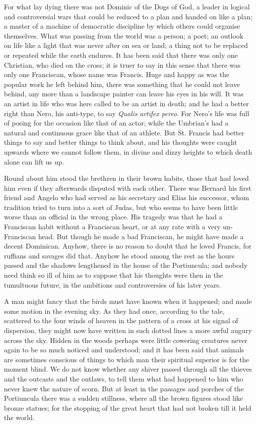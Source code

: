 \documentclass{book}
\begin{document}
For what lay dying there was not Dominic of the Dogs of God, a leader in logical and controversial wars that could be reduced to a plan and handed on like a plan; a master of a machine of democratic discipline by which others could organise themselves. What was passing from the world was a person; a poet; an outlook on life like a light that was never after on sea or land; a thing not to be replaced or repeated while the earth endures. It has been said that there was only one Christian, who died on the cross; it is truer to say in this sense that there was only one Franciscan, whose name was Francis. Huge and happy as was the popular work he left behind him, there was something that he could not leave behind, any more than a landscape painter can leave his eyes in his will. It was an artist in life who was here called to be an artist in death; and he had a better right than Nero, his anti-type, to say \emph{Qualis artifex pereo}. For Nero’s life was full of posing for the occasion like that of an actor; while the Umbrian’s had a natural and continuous grace like that of an athlete. But St. Francis had better things to say and better things to think about, and his thoughts were caught upwards where we cannot follow them, in divine and dizzy heights to which death alone can lift us up.

Round about him stood the brethren in their brown habits, those that had loved him even if they afterwards disputed with each other. There was Bernard his first friend and Angelo who had served as his secretary and Elias his successor, whom tradition tried to turn into a sort of Judas, but who seems to have been little worse than an official in the wrong place. His tragedy was that he had a Franciscan habit without a Franciscan heart, or at any rate with a very un-Franciscan head. But though he made a bad Franciscan, he might have made a decent Dominican. Anyhow, there is no reason to doubt that he loved Francis, for ruffians and savages did that. Anyhow he stood among the rest as the hours passed and the shadows lengthened in the house of the Portiuncula; and nobody need think so ill of him as to suppose that his thoughts were then in the tumultuous future, in the ambitions and controversies of his later years.

A man might fancy that the birds must have known when it happened; and made some motion in the evening sky. As they had once, according to the tale, scattered to the four winds of heaven in the pattern of a cross at his signal of dispersion, they might now have written in such dotted lines a more awful augury across the sky. Hidden in the woods perhaps were little cowering creatures never again to be so much noticed and understood; and it has been said that animals are sometimes conscious of things to which man their spiritual superior is for the moment blind. We do not know whether any shiver passed through all the thieves and the outcasts and the outlaws, to tell them what had happened to him who never knew the nature of scorn. But at least in the passages and porches of the Portiuncula there was a sudden stillness, where all the brown figures stood like bronze statues; for the stopping of the great heart that had not broken till it held the world.
\end{document}
